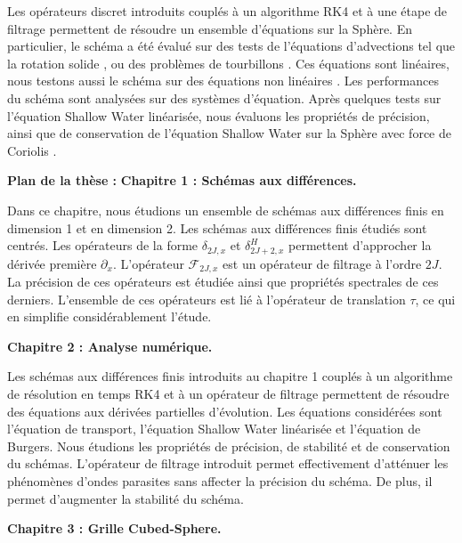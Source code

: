 Les opérateurs discret introduits couplés à un algorithme RK4 et à une étape de filtrage permettent de résoudre un ensemble d'équations sur la Sphère. En particulier, le schéma a été évalué sur des tests de l'équations d'advections tel que la rotation solide \cite{Williamson1992}, ou des problèmes de tourbillons \cite{Nair2002,Nair2008}. Ces équations sont linéaires, nous testons aussi le schéma sur des équations non linéaires \cite{BenArtzi2009}.
Les performances du schéma sont analysées sur des systèmes d'équation. Après quelques tests sur l'équation Shallow Water linéarisée, nous évaluons les propriétés de précision, ainsi que de conservation de l'équation Shallow Water sur la Sphère avec force de Coriolis \cite{Williamson1992,Galewsky2004}.



\vspace{0.7cm}
\textbf{Plan de la thèse :}
\textbf{Chapitre 1 : Schémas aux différences.}

Dans ce chapitre, nous étudions un ensemble de schémas aux différences finis en dimension 1 et en dimension 2. Les schémas aux différences finis étudiés sont centrés. Les opérateurs de la forme $\delta_{2J,x}$ et $\delta_{2J+2,x}^H$ permettent d'approcher la dérivée première $\partial_x$. L'opérateur $\mathcal{F}_{2J,x}$ est un opérateur de filtrage à l'ordre $2J$. La précision de ces opérateurs est étudiée ainsi que propriétés spectrales de ces derniers. L'ensemble de ces opérateurs est lié à l'opérateur de translation $\tau$, ce qui en simplifie considérablement l'étude.





\vspace{0.7cm}
\textbf{Chapitre 2 : Analyse numérique.}

Les schémas aux différences finis introduits au chapitre 1 couplés à un algorithme de résolution en temps RK4 et à un opérateur de filtrage permettent de résoudre des équations aux dérivées partielles d'évolution. Les équations considérées sont l'équation de transport, l'équation Shallow Water linéarisée et l'équation de Burgers. Nous étudions les propriétés de précision, de stabilité et de conservation du schémas. L'opérateur de filtrage introduit permet effectivement d'atténuer les phénomènes d'ondes parasites sans affecter la précision du schéma. De plus, il permet d'augmenter la stabilité du schéma.





\vspace{0.7cm}
\textbf{Chapitre 3 : Grille Cubed-Sphere.}

